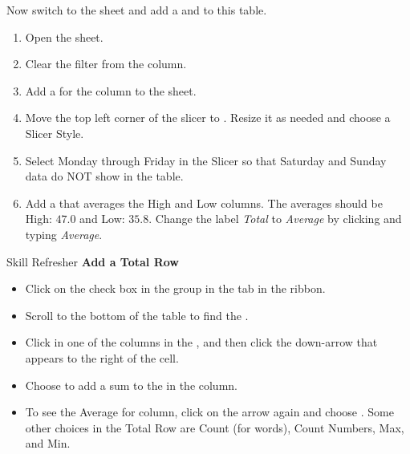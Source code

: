 Now switch to the  sheet and add a  and  to this table.

\begin{enumerate}
	\item Open the  sheet.
	\item Clear the filter from the  column.
	\item Add a  for the  column to the sheet.
	\item Move the top left corner of the slicer to . Resize it as needed and choose a Slicer Style.
	\item Select Monday through Friday in the Slicer so that Saturday and Sunday data do NOT show in the table.
	\item Add a  that averages the High and Low columns. The averages should be High: $ 47.0 $ and Low: $ 35.8 $. Change the label \textit{Total} to \textit{Average} by clicking  and typing \textit{Average}.
\end{enumerate}

\begin{center}
	\begin{sklbox}{Skill Refresher}
		\textbf{Add a Total Row}
		\\
		\begin{itemize}
			\setlength{\itemsep}{0pt}
			\setlength{\parskip}{0pt}
			\setlength{\parsep}{0pt}

			\item Click on the  check box in the  group in the  tab in the ribbon.
			\item Scroll to the bottom of the table to find the .
			\item Click in one of the columns in the , and then click the down-arrow that appears to the right of the cell.
			\item Choose  to add a sum to the  in the column.
			\item To see the Average for column, click on the arrow again and choose . Some other choices in the Total Row are Count (for words), Count Numbers, Max, and Min.
			
		\end{itemize}
	\end{sklbox}
\end{center}

